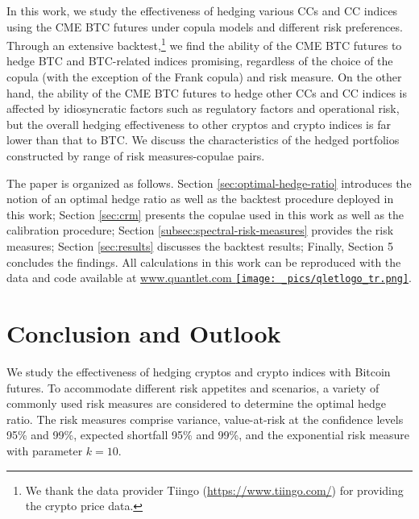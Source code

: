 \documentclass[11pt,a4paper,english]{article}
\begin{document}
In this work, we study the effectiveness of hedging various CCs and
CC indices using the CME BTC futures under copula models and different
risk preferences. 
Through an extensive backtest,\footnote{We thank the data provider
  Tiingo (\href{https://www.tiingo.com/}{https://www.tiingo.com/}) for
  providing the crypto price data.}
 we find the ability of the CME BTC futures to hedge BTC and BTC-related
 indices promising, regardless of the choice of the copula (with the
 exception of the Frank copula) and risk measure. 
On the other hand, the ability of the CME BTC futures to hedge other CCs and CC indices
is affected by idiosyncratic factors such as regulatory factors and operational risk,
but the overall hedging effectiveness to other cryptos and crypto indices is far lower
than that to BTC.
We discuss the characteristics of the hedged portfolios constructed by range of risk measures-copulae pairs.

The paper is organized as follows. Section \ref{sec:optimal-hedge-ratio} introduces the notion of
an optimal hedge ratio as well as the backtest procedure deployed in this work;
Section \ref{sec:crm} presents the copulae used in this work as well as the calibration procedure;
Section \ref{subsec:spectral-risk-measures} provides the risk measures;
Section \ref{sec:results} discusses the backtest results; Finally,
Section 5 concludes the findings. 
All calculations in this work can be reproduced with the data and code
available at \href{http://www.quantlet.com/}{www.quantlet.com
  {\texttt{[image: \_pics/qletlogo\_tr.png]}}}. 



%


\section{Conclusion and Outlook}\label{sec:conclusion-and-outlook}
We study the effectiveness of hedging cryptos and crypto indices with
Bitcoin futures.
To accommodate different risk appetites and scenarios, a variety of
commonly used risk measures are considered to determine the optimal
hedge ratio. The risk measures comprise variance, value-at-risk at
the confidence levels 95\% and 99\%, expected shortfall 95\% and 99\%,
and the exponential risk measure with parameter $k=10$.
\end{document}
